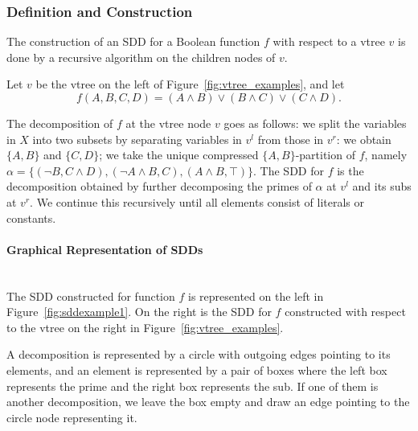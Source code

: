 \documentclass[11pt]{article}
\newcommand{\myparagraph}[1]{\paragraph{#1}\mbox{}\\}
\begin{document}
\subsubsection{Definition and Construction}

The construction of an SDD for a Boolean function $f$ with respect to a vtree $v$ is done by a recursive algorithm on the children nodes of $v$. 

Let $v$ be the vtree on the left of Figure~\ref{fig:vtree_examples}, and let $$f(A, B, C, D) = (A \land B) \lor (B \land C) \lor (C \land D).$$

The decomposition of $f$ at the vtree node $v$ goes as follows: we split the variables in $X$ into two subsets by separating variables in $v^l$ from those in $v^r$: we obtain $\{A, B\}$ and $\{C, D\}$; we take the unique compressed $\{A, B\}$-partition of $f$, namely $\alpha = \{(\lnot B , C\land D), (\lnot A \land B, C), (A \land B, \top)\}$. The SDD for $f$ is the decomposition obtained by further decomposing the primes of $\alpha$ at $v^l$ and its subs at $v^r$. We continue this recursively until all elements consist of literals or constants. 

\myparagraph{Graphical Representation of SDDs}

The SDD constructed for function $f$ is represented on the left in Figure~\ref{fig:sddexample1}. On the right is the SDD for $f$ constructed with respect to the vtree on the right in Figure~\ref{fig:vtree_examples}.

A decomposition is represented by a circle with outgoing edges pointing to its elements, and an element is represented by a pair of boxes where the left box represents the prime and the right box represents the sub. If one of them is another decomposition, we leave the box empty and draw an edge pointing to the circle node representing it.
\end{document}

